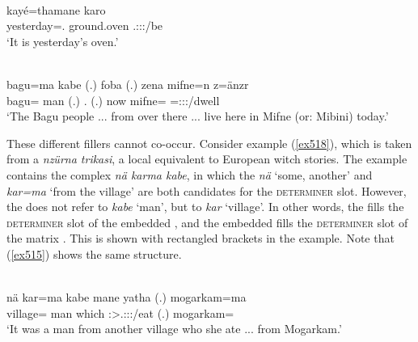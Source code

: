 \begin{exe}
	\\
	\gll kayé=thamane karo \\
	yesterday=\Temp.\Poss{} {ground.oven} \Tsg.\F:\Sbj:\Nonpast:\Ipfv/be\\
	\trans `It is yesterday's oven.'
	\label{ex516}
\end{exe}
\begin{exe}
 	\\
 	\gll bagu=ma kabe (.) foba (.) zena mifne=n z=änzr\\
 	bagu=\Char{} man (.) \Dist.\Abl{} (.) now mifne=\Loc{} \Prox=\Stpl:\Sbj:\Nonpast:\Ipfv/dwell\\
 	\trans `The Bagu people ... from over there ... live here in Mifne (or: Mibini) today.'
 	\label{ex517}
\end{exe}

These different fillers cannot co-occur. Consider example (\ref{ex518}), which is taken from a \emph{nzürna trikasi}, a local equivalent to European witch stories. The example contains the complex  \emph{nä karma kabe}, in which the  \emph{nä} `some, another' and \emph{kar=ma} `from the village' are both candidates for the \textsc{determiner} slot. However, the  does not refer to \emph{kabe} `man', but to \emph{kar} `village'. In other words, the  fills the \textsc{determiner} slot of the embedded , and the embedded  fills the \textsc{determiner} slot of the matrix . This is shown with rectangled brackets in the example. Note that (\ref{ex515}) shows the same structure.

\begin{exe}
	\\
	\gll nä kar=ma kabe mane yatha (.) mogarkam=ma\\
	\Indf{} village=\Char{} man which \Stsg:\Sbj>\Tsg.\Masc:\Obj:\Pst:\Ipfv/eat (.) mogarkam=\Char{}\\
	\trans `It was a man from another village who she ate ... from Mogarkam.'\\
	\label{ex518}
\end{exe}

